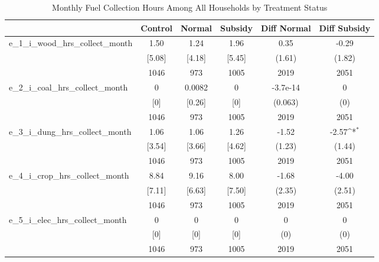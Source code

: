 \begin{table}[htbp]\centering
\def\sym#1{\ifmmode^{#1}\else\(^{#1}\)\fi}
\caption{Monthly Fuel Collection Hours Among All Households by Treatment Status \label{tab:"balance"}}
\begin{tabular*}{0.9\hsize}{@{\hskip\tabcolsep\extracolsep\fill}l*{1}{ccccc}}
\toprule
                                &  Control&   Normal&  Subsidy&Diff Normal         &Diff Subsidy         \\
\midrule
e\_1\_i\_wood\_hrs\_collect\_month    &     1.50&     1.24&     1.96&     0.35         &    -0.29         \\
                                &   [5.08]&   [4.18]&   [5.45]&   (1.61)         &   (1.82)         \\
                                &     1046&      973&     1005&     2019         &     2051         \\
e\_2\_i\_coal\_hrs\_collect\_month    &        0&   0.0082&        0& -3.7e-14         &        0         \\
                                &      [0]&   [0.26]&      [0]&  (0.063)         &      (0)         \\
                                &     1046&      973&     1005&     2019         &     2051         \\
e\_3\_i\_dung\_hrs\_collect\_month    &     1.06&     1.06&     1.26&    -1.52         &    -2.57\sym{*}  \\
                                &   [3.54]&   [3.66]&   [4.62]&   (1.23)         &   (1.44)         \\
                                &     1046&      973&     1005&     2019         &     2051         \\
e\_4\_i\_crop\_hrs\_collect\_month    &     8.84&     9.16&     8.00&    -1.68         &    -4.00         \\
                                &   [7.11]&   [6.63]&   [7.50]&   (2.35)         &   (2.51)         \\
                                &     1046&      973&     1005&     2019         &     2051         \\
e\_5\_i\_elec\_hrs\_collect\_month    &        0&        0&        0&        0         &        0         \\
                                &      [0]&      [0]&      [0]&      (0)         &      (0)         \\
                                &     1046&      973&     1005&     2019         &     2051         \\

\end{tabular*}
\end{table}
